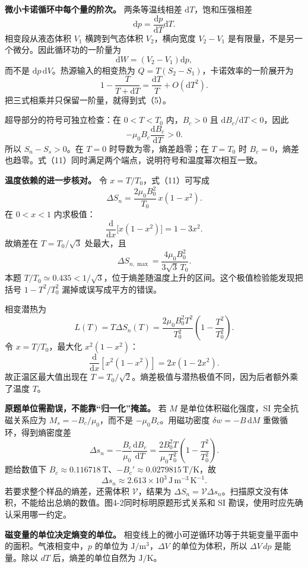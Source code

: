 \documentclass[12pt,a4paper,UTF8]{ctexart}
\begin{document}
\textbf{微小卡诺循环中每个量的阶次。} 两条等温线相差
\(\mathrm dT\)，饱和压强相差 \[
\mathrm dp=\frac{\mathrm dp}{\mathrm dT}\mathrm dT.
\] 相变段从液态体积 \(V_1\) 横跨到气态体积 \(V_2\)，横向宽度 \(V_2-V_1\)
是有限量，不是另一个微分。因此循环功的一阶量为 \[
\mathrm dW=(V_2-V_1)\mathrm dp,
\] 而不是 \(\mathrm dp\,\mathrm dV\)。热源输入的相变热为
\(Q=T(S_2-S_1)\)，卡诺效率的一阶展开为 \[
1-\frac{T}{T+\mathrm dT}
=\frac{\mathrm dT}{T}+O(\mathrm dT^2).
\] 把三式相乘并只保留一阶量，就得到式（5）。

超导部分的符号可独立检查：在 \(0<T<T_0\) 内，\(B_c>0\) 且
\(\mathrm dB_c/\mathrm dT<0\)，因此 \[
-\mu_0B_c\frac{\mathrm dB_c}{\mathrm dT}>0.
\] 所以 \(S_n-S_s>0\)。在 \(T=0\) 时导数为零，熵差趋零；在 \(T=T_0\) 时
\(B_c=0\)，熵差也趋零。式（11）同时满足两个端点，说明符号和温度幂次相互一致。

\textbf{温度依赖的进一步核对。} 令 \(x=T/T_0\)，式（11）可写成 \[
\Delta S_n=
\frac{2\mu_0B_0^2}{T_0}\,x(1-x^2).
\] 在 \(0<x<1\) 内求极值： \[
\frac{\mathrm d}{\mathrm dx}\bigl[x(1-x^2)\bigr]
=1-3x^2.
\] 故熵差在 \(T=T_0/\sqrt3\) 处最大，且 \[
\Delta S_{n,\max}
=\frac{4\mu_0B_0^2}{3\sqrt3\,T_0}.
\] 本题
\(T/T_0\simeq0.435<1/\sqrt3\)，位于熵差随温度上升的区间。这个极值检验能发现把括号
\(1-T^2/T_0^2\) 漏掉或误写成平方的错误。

相变潜热为 \[
L(T)=T\Delta S_n(T)
=\frac{2\mu_0B_0^2T^2}{T_0^2}
\left(1-\frac{T^2}{T_0^2}\right).
\] 令 \(x=T/T_0\)，最大化 \(x^2(1-x^2)\)： \[
\frac{\mathrm d}{\mathrm dx}[x^2(1-x^2)]
=2x(1-2x^2).
\] 故正温区最大值出现在
\(T=T_0/\sqrt2\)。熵差极值与潜热极值不同，因为后者额外乘了温度 \(T\)。

\textbf{原题单位需勘误，不能靠``归一化''掩盖。} 若 \(M\)
是单位体积磁化强度，SI 完全抗磁关系应为 \(M_s=-B_c/\mu_0\)，而不是
\(-\mu_0B_c\)。用磁功密度 \(\delta w=-B\,\mathrm dM\)
重做循环，得到熵密度差 \[
\boxed{\Delta s_n=-\frac{B_c}{\mu_0}\frac{\mathrm dB_c}{\mathrm dT}
=\frac{2B_0^2T}{\mu_0T_0^2}\left(1-\frac{T^2}{T_0^2}\right)}.
\] 题给数值下
\(B_c\approx0.116718\,\mathrm T\)、\(-B_c'\approx0.0279815\,\mathrm{T/K}\)，故
\[
\boxed{\Delta s_n\approx2.613\times10^3\,
\mathrm{J\,m^{-3}\,K^{-1}}}.
\] 若要求整个样品的熵差，还需体积 \(\mathcal V\)，结果为
\(\Delta S_n=\mathcal V\Delta s_n\)。扫描原文没有体积，不能给出总熵的数值。图4-2同时标明原题形式关系和
SI 勘误，使用时应先确认采用哪一约定。

\textbf{磁变量的单位决定熵变的单位。}
相变线上的微小可逆循环功等于共轭变量平面中的面积。气液相变中，\(p\)
的单位为 \(\mathrm{J/m^3}\)，\(\Delta V\) 的单位为体积，所以
\(\Delta V\,dp\) 是能量。除以 \(dT\) 后，熵差的单位自然为
\(\mathrm{J/K}\)。
\end{document}

